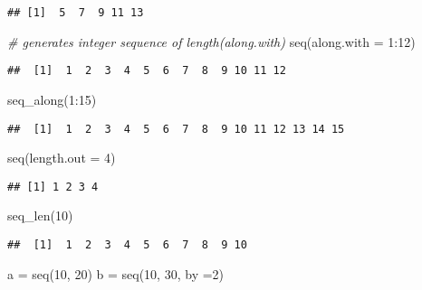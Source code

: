 \documentclass[
]{book}
\newenvironment{Shaded}{\begin{snugshade}}{\end{snugshade}}
\newcommand{\AttributeTok}[1]{\textcolor[rgb]{0.77,0.63,0.00}{#1}}
\newcommand{\CommentTok}[1]{\textcolor[rgb]{0.56,0.35,0.01}{\textit{#1}}}
\newcommand{\DecValTok}[1]{\textcolor[rgb]{0.00,0.00,0.81}{#1}}
\newcommand{\FunctionTok}[1]{\textcolor[rgb]{0.00,0.00,0.00}{#1}}
\newcommand{\NormalTok}[1]{#1}
\newcommand{\OtherTok}[1]{\textcolor[rgb]{0.56,0.35,0.01}{#1}}
\newcommand{\SpecialCharTok}[1]{\textcolor[rgb]{0.00,0.00,0.00}{#1}}
\begin{document}
\begin{verbatim}
## [1]  5  7  9 11 13
\end{verbatim}

\begin{Shaded}
\begin{Highlighting}[]
\CommentTok{\# generates integer sequence of length(along.with)}
\FunctionTok{seq}\NormalTok{(}\AttributeTok{along.with =} \DecValTok{1}\SpecialCharTok{:}\DecValTok{12}\NormalTok{)}
\end{Highlighting}
\end{Shaded}

\begin{verbatim}
##  [1]  1  2  3  4  5  6  7  8  9 10 11 12
\end{verbatim}

\begin{Shaded}
\begin{Highlighting}[]
\FunctionTok{seq\_along}\NormalTok{(}\DecValTok{1}\SpecialCharTok{:}\DecValTok{15}\NormalTok{)}
\end{Highlighting}
\end{Shaded}

\begin{verbatim}
##  [1]  1  2  3  4  5  6  7  8  9 10 11 12 13 14 15
\end{verbatim}

\begin{Shaded}
\begin{Highlighting}[]
\FunctionTok{seq}\NormalTok{(}\AttributeTok{length.out =} \DecValTok{4}\NormalTok{)}
\end{Highlighting}
\end{Shaded}

\begin{verbatim}
## [1] 1 2 3 4
\end{verbatim}

\begin{Shaded}
\begin{Highlighting}[]
\FunctionTok{seq\_len}\NormalTok{(}\DecValTok{10}\NormalTok{)}
\end{Highlighting}
\end{Shaded}

\begin{verbatim}
##  [1]  1  2  3  4  5  6  7  8  9 10
\end{verbatim}

\begin{Shaded}
\begin{Highlighting}[]
\NormalTok{a }\OtherTok{=} \FunctionTok{seq}\NormalTok{(}\DecValTok{10}\NormalTok{, }\DecValTok{20}\NormalTok{)}
\NormalTok{b }\OtherTok{=} \FunctionTok{seq}\NormalTok{(}\DecValTok{10}\NormalTok{, }\DecValTok{30}\NormalTok{, }\AttributeTok{by =}\DecValTok{2}\NormalTok{)}
\end{Highlighting}
\end{Shaded}
\end{document}

